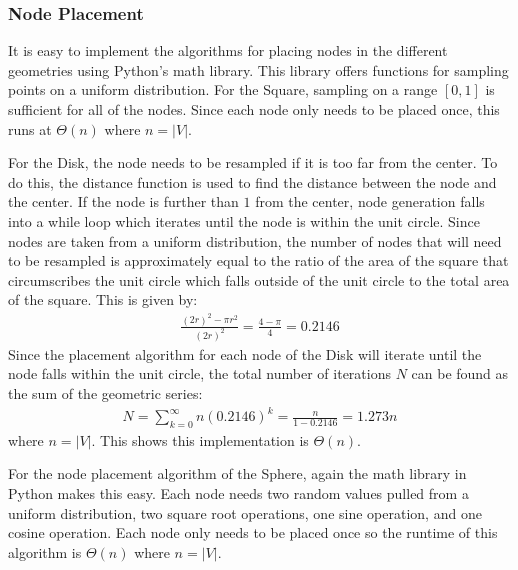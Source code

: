 \documentclass{article}
\begin{document}
        \subsubsection{Node Placement}
        It is easy to implement the algorithms for placing nodes in the different geometries using Python's math library. This library offers functions for sampling points on a uniform distribution. For the Square, sampling on a range $[0,1]$ is sufficient for all of the nodes. Since each node only needs to be placed once, this runs at $\Theta(n)$ where $n = |V|$.
        \par
        For the Disk, the node needs to be resampled if it is too far from the center. To do this, the distance function is used to find the distance between the node and the center. If the node is further than $1$ from the center, node generation falls into a while loop which iterates until the node is within the unit circle. Since nodes are taken from a uniform distribution, the number of nodes that will need to be resampled is approximately equal to the ratio of the area of the square that circumscribes the unit circle which falls outside of the unit circle to the total area of the square. This is given by:
        \begin{align}
            \frac{(2r)^2-\pi r^2}{(2r)^2} = \frac{4-\pi}{4} = 0.2146
        \end{align}
        Since the placement algorithm for each node of the Disk will iterate until the node falls within the unit circle, the total number of iterations $N$ can be found as the sum of the geometric series:
        \begin{align}
            N = \sum_{k=0}^{\infty} n (0.2146)^k = \frac{n}{1-0.2146} = 1.273n
        \end{align}
        where $n = |V|$. This shows this implementation is $\Theta\left(n\right)$.
        \par
        For the node placement algorithm of the Sphere, again the math library in Python makes this easy. Each node needs two random values pulled from a uniform distribution, two square root operations, one sine operation, and one cosine operation. Each node only needs to be placed once so the runtime of this algorithm is $\Theta(n)$ where $n = |V|$.
\end{document}
